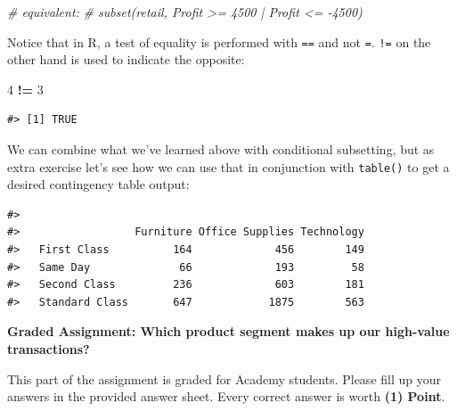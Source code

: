 \documentclass[]{article}
\newenvironment{Shaded}{\begin{snugshade}}{\end{snugshade}}
\newcommand{\CommentTok}[1]{\textcolor[rgb]{0.56,0.35,0.01}{\textit{#1}}}
\newcommand{\DecValTok}[1]{\textcolor[rgb]{0.00,0.00,0.81}{#1}}
\newcommand{\KeywordTok}[1]{\textcolor[rgb]{0.13,0.29,0.53}{\textbf{#1}}}
\newcommand{\NormalTok}[1]{#1}
\newcommand{\OperatorTok}[1]{\textcolor[rgb]{0.81,0.36,0.00}{\textbf{#1}}}
\newcommand{\StringTok}[1]{\textcolor[rgb]{0.31,0.60,0.02}{#1}}
\begin{document}
\begin{Shaded}
\begin{Highlighting}[]
\CommentTok{# equivalent:}
\CommentTok{# subset(retail, Profit >= 4500 | Profit <= -4500)}
\end{Highlighting}
\end{Shaded}

Notice that in R, a test of equality is performed with \texttt{==} and
not \texttt{=}. \texttt{!=} on the other hand is used to indicate the
opposite:

\begin{Shaded}
\begin{Highlighting}[]
\DecValTok{4} \OperatorTok{!=}\StringTok{ }\DecValTok{3}
\end{Highlighting}
\end{Shaded}

\begin{verbatim}
#> [1] TRUE
\end{verbatim}

We can combine what we've learned above with conditional subsetting, but
as extra exercise let's see how we can use that in conjunction with
\texttt{table()} to get a desired contingency table output:

\begin{Shaded}
\end{Shaded}

\begin{verbatim}
#>                 
#>                  Furniture Office Supplies Technology
#>   First Class          164             456        149
#>   Same Day              66             193         58
#>   Second Class         236             603        181
#>   Standard Class       647            1875        563
\end{verbatim}

\textbf{Graded Assignment: Which product segment makes up our high-value
transactions?}

This part of the assignment is graded for Academy students. Please fill
up your answers in the provided answer sheet. Every correct answer is
worth \textbf{(1) Point}.
\end{document}
